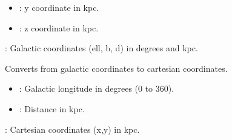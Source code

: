 \documentclass[letterpaper,10pt,english]{sphinxmanual}
\begin{document}
\begin{fulllineitems}
\begin{fulllineitems}
\begin{description}
\begin{itemize}
\item {} 
\sphinxAtStartPar
{}: y coordinate in kpc.

\item {} 
\sphinxAtStartPar
{}: z coordinate in kpc.

\end{itemize}

\sphinxAtStartPar
{}: Galactic coordinates (ell, b, d) in degrees and kpc.

\end{description}

\end{fulllineitems}


\begin{fulllineitems}
\label{\detokenize{ModelHelper:ModelHelper.ModelHelper.convert_galactic_to_cartesian_2D}}
\pysigstartsignatures
{}
\pysigstopsignatures
\sphinxAtStartPar
Converts from galactic coordinates to cartesian coordinates.
\begin{description}
\begin{itemize}
\item {} 
\sphinxAtStartPar
{}: Galactic longitude in degrees (0 to 360).

\item {} 
\sphinxAtStartPar
{}: Distance in kpc.

\end{itemize}

\sphinxAtStartPar
{}: Cartesian coordinates (x,y) in kpc.

\end{description}

\end{fulllineitems}



\end{fulllineitems}
\end{document}
